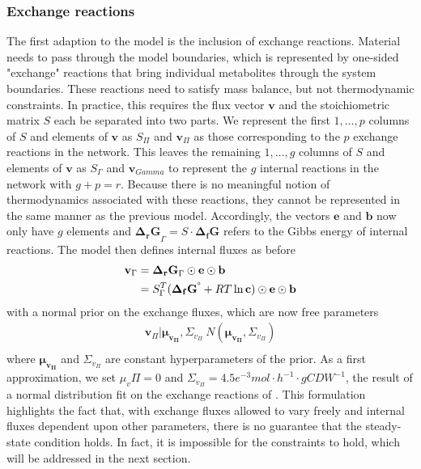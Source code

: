 \documentclass[10pt,letterpaper]{article}
\newcommand{\dgf}{\Delta_fG}
\newcommand{\sdgf}{\Delta_fG^{\degree}}
\newcommand{\dgr}{\Delta_rG}
\newcommand{\bdgf}{\mathbf{\dgf}}
\newcommand{\bsdgf}{\mathbf{\sdgf}}
\newcommand{\bdgr}{\mathbf{\dgr}}
\newcommand{\be}{\mathbf{e}}
\newcommand{\bc}{\mathbf{c}}
\newcommand{\bb}{\mathbf{b}}
\newcommand{\bv}{\mathbf{v}}
\begin{document}
\subsubsection{Exchange reactions}
The first adaption to the model is the inclusion of exchange reactions.
Material needs to pass through the model boundaries, which is represented by one-sided "exchange" reactions that bring individual metabolites through the system boundaries.
These reactions need to satisfy mass balance, but not thermodynamic constraints.
In practice, this requires the flux vector $\bv$ and the stoichiometric matrix $S$ each be separated into two parts.
We represent the first $1,\dots,p$ columns of $S$ and elements of $\bv$ as $S_\Pi$ and $\bv_\Pi$ as those corresponding to the $p$ exchange reactions in the network.
This leaves the remaining $1,\dots,g$ columns of $S$ and elements of $\bv$ as $S_\Gamma$ and $\bv_{Gamma}$ to represent the $g$ internal reactions in the network with $g+p=r$.
Because there is no meaningful notion of thermodynamics associated with these reactions, they cannot be represented in the same manner as the previous model.
Accordingly, the vectors $\be$ and $\bb$ now only have $g$ elements and $\bdgr_{\Gamma} = S\cdot \bdgf$ refers to the Gibbs energy of internal reactions.
The model then defines internal fluxes as before
\begin{align}
    \bv_\Gamma &= \bdgr_{\Gamma} \odot \be \odot \bb \\
        &= S_{\Gamma}^T (\bsdgf + RT\ln{\bc}) \odot \be \odot \bb \\
\end{align}
with a normal prior on the exchange fluxes, which are now free parameters
\begin{align*}
    \bv_{\Pi}|\mathbf{\mu_{v_{\Pi}}}, \Sigma_{v_{\Pi}} ~ N(\mathbf{\mu_{v_{\Pi}}}, \Sigma_{v_{\Pi}}) \\
\end{align*}
where $\mathbf{\mu_{v_{\Pi}}}$ and $\Sigma_{v_{\Pi}}$ are constant hyperparameters of the prior.
As a first approximation, we set $\mu_v{\Pi}=0$ and $\Sigma_{v_{\Pi}}=4.5e^{-3} mol\cdot h^{-1} \cdot gCDW^{-1}$, the result of a normal distribution fit on the exchange reactions of \cite{GEROSA_2015_dataset_pseudo_transition}.
This formulation highlights the fact that, with exchange fluxes allowed to vary freely and internal fluxes dependent upon other parameters, there is no guarantee that the steady-state condition holds.
In fact, it is impossible for the constraints to hold, which will be addressed in the next section.
\end{document}
